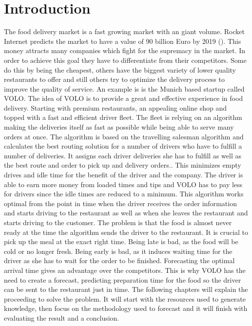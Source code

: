 \chapter{Introduction}\label{chapter:Introduction}

\renewcommand{\thepage}{\arabic{page}}
\setcounter{page}{1}

The food delivery market is a fast growing market with an giant volume. Rocket Internet predicts the market to have a value of 90 billion Euro by 2019 (\cite{Rocket}). This money attracts many companies which fight for the supremacy in the market. In order to achieve this goal they have to differentiate from their competitors. Some do this by being the cheapest, others have the biggest variety of lower quality restaurants to offer and still others try to optimize the delivery process to improve the quality of service.\newline
An example is is the Munich based startup called VOLO. The idea of VOLO is to provide a great and effective experience in food delivery. Starting with premium restaurants, an appealing online shop and topped with a fast and efficient driver fleet. The fleet is relying on an algorithm making the deliveries itself as fast as possible while being able to serve many orders at once. The algorithm is based on the travelling salesman algorithm and calculates the best routing solution for a number of drivers who have to fulfill a number of deliveries. It assigns each driver deliveries she has to fulfill as well as the best route and order to pick up and delivery orders.. This minimizes empty drives and idle time for the benefit of the driver and the company. The driver is able to earn more money from loaded times and tips and VOLO has to pay less for drivers since the idle times are reduced to a minimum.\newline
This algorithm works optimal from the point in time when the driver receives the order information and starts driving to the restaurant as well as when she leaves the restaurant and starts driving to the customer. The problem is that the food is almost never ready at the time the algorithm sends the driver to the restaurant. It is crucial to pick up the meal at the exact right time. Being late is bad, as the food will be cold or no longer fresh. Being early is bad, as it induces waiting time for the driver as she has to wait for the order to be finished. Forecasting the optimal arrival time gives an advantage over the competitors.\newline
This is why VOLO has the need to create a forecast, predicting preparation time for the food so the driver can be sent to the restaurant just in time.\newline
The following chapters will explain the proceeding to solve the problem. It will start with the resources used to generate knowledge, then focus on the methodology used to forecast and it will finish with evaluating the result and a conclusion.
